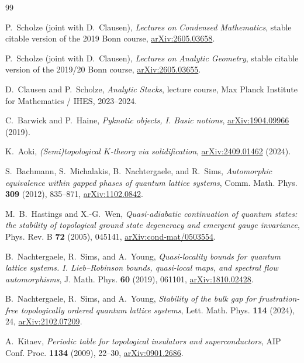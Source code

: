 \documentclass[12pt]{article}
\theoremstyle{plain}
\begin{document}
\begin{thebibliography}{99}

P.~Scholze (joint with D.~Clausen),
\emph{Lectures on Condensed Mathematics},
stable citable version of the 2019 Bonn course, \href{https://arxiv.org/abs/2605.03658}{arXiv:2605.03658}.

P.~Scholze (joint with D.~Clausen),
\emph{Lectures on Analytic Geometry},
stable citable version of the 2019/20 Bonn course, \href{https://arxiv.org/abs/2605.03655}{arXiv:2605.03655}.

D.~Clausen and P.~Scholze,
\emph{Analytic Stacks},
lecture course, Max Planck Institute for Mathematics / IHES, 2023--2024.

C.~Barwick and P.~Haine,
\emph{Pyknotic objects, I. Basic notions},
\href{https://arxiv.org/abs/1904.09966}{arXiv:1904.09966} (2019).

K.~Aoki,
\emph{(Semi)topological $K$-theory via solidification},
\href{https://arxiv.org/abs/2409.01462}{arXiv:2409.01462} (2024).

S.~Bachmann, S.~Michalakis, B.~Nachtergaele, and R.~Sims,
\emph{Automorphic equivalence within gapped phases of quantum lattice systems},
Comm. Math. Phys. \textbf{309} (2012), 835--871, \href{https://arxiv.org/abs/1102.0842}{arXiv:1102.0842}.

M.~B.~Hastings and X.-G.~Wen,
\emph{Quasi-adiabatic continuation of quantum states: the stability of topological
ground state degeneracy and emergent gauge invariance},
Phys. Rev. B \textbf{72} (2005), 045141, \href{https://arxiv.org/abs/cond-mat/0503554}{arXiv:cond-mat/0503554}.

B.~Nachtergaele, R.~Sims, and A.~Young,
\emph{Quasi-locality bounds for quantum lattice systems. I. Lieb--Robinson bounds,
quasi-local maps, and spectral flow automorphisms},
J. Math. Phys. \textbf{60} (2019), 061101, \href{https://arxiv.org/abs/1810.02428}{arXiv:1810.02428}.

B.~Nachtergaele, R.~Sims, and A.~Young,
\emph{Stability of the bulk gap for frustration-free topologically ordered quantum
lattice systems},
Lett. Math. Phys. \textbf{114} (2024), 24, \href{https://arxiv.org/abs/2102.07209}{arXiv:2102.07209}.

A.~Kitaev,
\emph{Periodic table for topological insulators and superconductors},
AIP Conf. Proc. \textbf{1134} (2009), 22--30, \href{https://arxiv.org/abs/0901.2686}{arXiv:0901.2686}.


\end{thebibliography}
\end{document}
